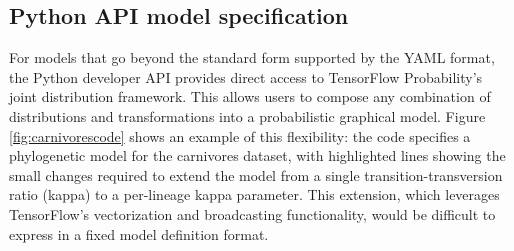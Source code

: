 \documentclass[12pt]{article}
\begin{document}
\subsection*{Python API model specification}

For models that go beyond the standard form supported by the YAML format, the Python developer API provides direct access to TensorFlow Probability's joint distribution framework. This allows users to compose any combination of distributions and transformations into a probabilistic graphical model. Figure \ref{fig:carnivorescode} shows an example of this flexibility: the code specifies a phylogenetic model for the carnivores dataset, with highlighted lines showing the small changes required to extend the model from a single transition-transversion ratio (kappa) to a per-lineage kappa parameter. This extension, which leverages TensorFlow's vectorization and broadcasting functionality, would be difficult to express in a fixed model definition format.
\end{document}
